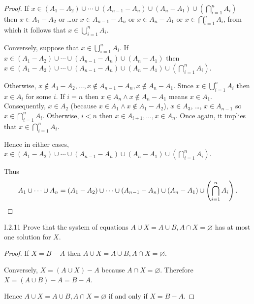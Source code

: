 \begin{proof}
	If \( x \in (A_{1} - A_{2}) \cup \cdots \cup (A_{n-1} - A_{n}) \cup (A_{n} - A_{1}) \cup \left( \bigcap^{n}_{i=1}A_{i} \right) \) then \( x \in A_{1} - A_{2} \) or \ldots or \( x \in A_{n-1} - A_{n} \) or \( x \in A_{n} - A_{1} \) or \( x \in \bigcap^{n}_{i=1}A_{i} \), from which it follows that \( x \in \bigcup^{n}_{i=1} A_{i} \).

	Conversely, suppose that \( x \in \bigcup^{n}_{i=1}A_{i} \). If \( x \in (A_{1} - A_{2}) \cup \cdots \cup (A_{n-1} - A_{n}) \cup (A_{n} - A_{1}) \) then \( x \in (A_{1} - A_{2}) \cup \cdots \cup (A_{n-1} - A_{n}) \cup (A_{n} - A_{1}) \cup \left( \bigcap^{n}_{i=1}A_{i} \right) \).

	Otherwise, \( x \notin A_{1} - A_{2}, \ldots, x\notin A_{n-1} - A_{n}, x \notin A_{n} - A_{1} \). Since \( x \in \bigcup^{n}_{i=1}A_{i} \) then \( x \in A_{i} \) for some \( i \). If \( i = n \) then \( x \in A_{n} \land x \notin A_{n} - A_{1} \) means \( x \in A_{1} \). Consequently, \( x \in A_{2} \) (because \( x \in A_{1} \land x \notin A_{1} - A_{2} \)), \( x \in A_{3} \), \ldots, \( x \in A_{n-1} \) so \( x \in \bigcap^{n}_{i=1}A_{i} \). Otherwise, \( i < n \) then \( x\in A_{i+1}, \ldots, x\in A_{n} \). Once again, it implies that \( x \in \bigcap^{n}_{i=1} A_{i} \).

	Hence in either cases, \( x \in (A_{1} - A_{2}) \cup \cdots \cup (A_{n-1} - A_{n}) \cup (A_{n} - A_{1}) \cup \left( \bigcap^{n}_{i=1}A_{i} \right) \).

	Thus
	\[
		A_{1} \cup \cdots \cup A_{n} = (A_{1} - A_{2}) \cup \cdots \cup (A_{n-1} - A_{n}) \cup (A_{n} - A_{1}) \cup \left( \bigcap^{n}_{i=1}A_{i} \right).\qedhere
	\]
\end{proof}

\begin{problem}{I.2.11}
Prove that the system of equations \( A\cup X = A\cup B, A \cap X = \varnothing \) has at most one solution for \(X\).
\end{problem}

\begin{proof}
	If \( X = B - A \) then \( A\cup X = A\cup B, A \cap X = \varnothing \).

	Conversely, \( X = (A \cup X) - A \) because \( A\cap X = \varnothing \). Therefore \( X = (A \cup B) - A = B - A \).

	Hence \( A\cup X = A\cup B, A \cap X = \varnothing \) if and only if \( X = B - A \).
\end{proof}

